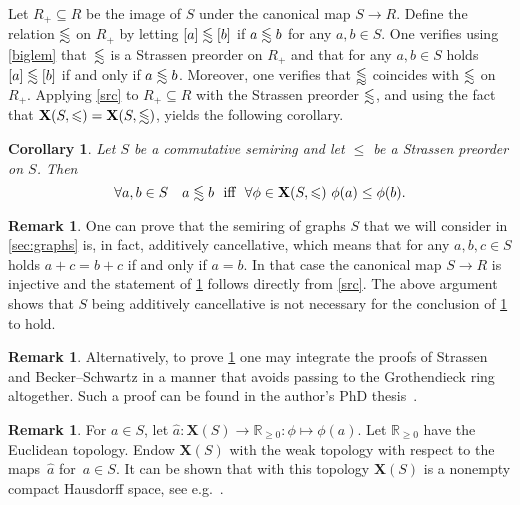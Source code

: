 \documentclass[a4paper, fleqn]{amsart}
\theoremstyle{plain}
\newtheorem{corollary}[theorem]{Corollary}
\theoremstyle{definition}
\newtheorem{remark}[theorem]{Remark}
\newcommand{\RR}{\mathbb{R}}
\newcommand{\jeroen}[1]{#1}
\let\leqx\leqslant
\newcommand{\asympleqx}{%
  \mathrel{%
    \vphantom{\leqslant}%
    \smash{\vcenter{\doasympleqx}}%
  }%
}
\newcommand{\doasympleqx}{%
  \hbox{\ooalign{%
    \noalign{\kern.25ex}
    $\leqslant$\cr
    \noalign{\kern1.25ex}
    \smash{$\sim$}\cr
  }}%
}
\newcommand{\aspec}{\mathbf{X}}
\let\leqx\leqslant
\newcommand{\asympasympleqx}{%
  \mathrel{%
    \vphantom{\preccurlyeq}%
    \smash{\vcenter{\doasympasympleqx}}%
  }%
}
\newcommand{\doasympasympleqx}{%
  \hbox{\ooalign{%
    \noalign{\kern.25ex}
    $\leqx$\cr
    \noalign{\kern1.25ex}
    \smash{$\sim$}\cr
    \noalign{\kern0.5ex}
    \smash{$\sim$}\cr
  }}%
}
\begin{document}
{Let $R_+ \subseteq R$ be the image of $S$ under the canonical map $S \to R$. Define the relation $\asympleqx$ on $R_+$ by letting $[a] \asympleqx [b]$ if $a \asympleqx b$ for any $a,b \in S$. One verifies using \cref{biglem} that~$\asympleqx$ is a Strassen preorder on $R_+$ and that for any $a,b \in S$ holds~$[a] \asympleqx [b]$ if and only if $a \asympleqx b$.  Moreover, one verifies that $\asympasympleqx$ coincides with $\asympleqx$ on $R_+$. Applying \cref{src} to $R_+ \subseteq R$ with the Strassen preorder $\asympleqx$, and using the fact that $\aspec(S, \leqx) = \aspec(S, \asympleqx)$, yields the following corollary.

\begin{corollary}%
\label{str_mainth}
Let $S$ be a commutative semiring and let $\leqx$ be a Strassen preorder on $S$. Then
%
\[
\forall a,b \in S\quad
a\asympleqx b \,\,\textnormal{ iff }\,\, \forall\phi \in \aspec(S, \leqx)\,\, \phi(a) \leq \phi(b).
\]
\end{corollary}
}

\jeroen{
\begin{remark}
One can prove that the semiring of graphs $S$ that we will consider in \cref{sec:graphs} is, in fact, additively cancellative, which means that for any $a,b,c \in S$ holds $a+c = b+c$ if and only if $a = b$. 
In that case the canonical map $S \to R$ is injective and the statement of \cref{str_mainth} follows directly from \cref{src}. The above argument shows that $S$ being additively cancellative is not necessary for the conclusion of \cref{str_mainth} to hold.
\end{remark}}

\begin{remark}
%
%
Alternatively, to prove \cref{str_mainth} one may integrate the proofs of Strassen \cite{strassen1988asymptotic} and Becker--Schwartz \cite{MR707730} in a manner that avoids passing to the Grothendieck ring altogether. Such a proof can be found in the author's PhD thesis~\cite[Chapter 2]{phd}.
\end{remark}

\begin{remark}
%
%
%

For $a \in S$, let 
%
$\hat{a} : \aspec(S) \to \RR_{\geq 0} : \phi \mapsto \phi(a)$.
%
%
Let $\RR_{\geq 0}$ have the Euclidean topology.
Endow $\aspec(S)$ with the weak topology with respect to the maps~$\hat{a}$ for~$a \in S$. %
It can be shown that with this topology $\aspec(S)$ is a nonempty compact Hausdorff space, see e.g.~\cite{strassen1988asymptotic}.
\end{remark}
\end{document}
